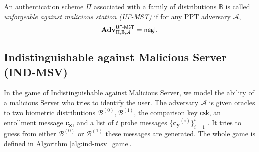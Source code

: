 An authentication scheme $\Pi$ associated with a family of distributions $\mathbb{B}$ is called \emph{unforgeable against malicious station (UF-MST)} if for any PPT adversary $\mathcal{A}$,
\[
	\mathbf{Adv}^{\textsf{UF-MST}}_{\Pi, \mathbb{B}, \mathcal{A}} = \mathsf{negl}.
\]




\subsection{Indistinguishable against Malicious Server (IND-MSV)}
\label{sec:ind-msv_game}

In the game of Indistinguishable against Malicious Server, we model the ability of a malicious \textsf{Server} who tries to identify the user. The adversary $\mathcal{A}$ is given oracles to two biometric distributions $\mathcal{B}^{(0)}, \mathcal{B}^{(1)}$, the comparison key $\textsf{csk}$, an enrollment message $\mathbf{c_x}$, and a list of $t$ probe messages $\{ \mathbf{c_y}^{(i)} \}_{i=1}^t$ . It tries to guess from either $\mathcal{B}^{(0)}$ or $ \mathcal{B}^{(1)}$ these messages are generated. The whole game is defined in Algorithm \ref{alg:ind-msv_game}.


